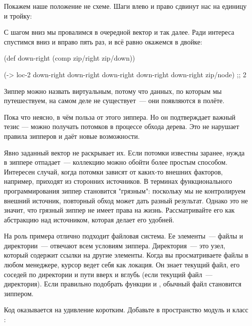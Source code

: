 Покажем наше положение не схеме. Шаги влево и право сдвинут нас на единицу и
тройку:

\begin{figure}[H]
  \centering
  
\end{figure}

С шагом вниз мы провалимся в очередной вектор \code{[1 2 3]} и так далее. Ради
интереса спустимся вниз и вправо пять раз, и всё равно окажемся в двойке:

\begin{english}
  \begin{clojure}
(def down-right (comp zip/right zip/down))

(-> loc-2
    down-right
    down-right
    down-right
    down-right
    down-right
    zip/node)
;; 2
  \end{clojure}
\end{english}

Зиппер можно назвать виртуальным, потому что данных, по которым мы путешествуем,
на самом деле не существует~--- они появляются в полёте.

Пока что неясно, в чём польза от этого зиппера. Но он подтверждает важный тезис
— можно получать потомков в процессе обхода дерева. Это не нарушает правила
зипперов и даёт новые возможности.

Явно заданный вектор \code{[1 2 3]} не раскрывает их. Если потомки известны заранее,
нужда в зиппере отпадает~--- коллекцию можно обойти более простым
способом. Интересен случай, когда потомки зависят от каких-то внешних факторов,
например, приходят из сторонних источников. В терминах функционального
программирования зиппер становится "грязным": поскольку мы не контролируем
внешний источник, повторный обход может дать разный результат. Однако это не
значит, что грязный зиппер не имеет права на жизнь. Рассматривайте его как
абстракцию над источником, которая делает его удобней.

На роль примера отлично подходит файловая система. Ее элементы~--- файлы и
директории~--- отвечают всем условиям зиппера. Директория~--- это узел, который
содержит ссылки на другие элементы. Когда вы просматриваете файлы в любом
менеджере, курсор ведет себя как локация. Он знает текущий файл, его соседей по
директории и пути вверх и вглубь (если текущий файл~--- директория). Если
правильно подобрать функции  и , обычный файл становится
зиппером.

Код оказывается на удивление коротким. Добавьте в пространство модуль
 и класс :

